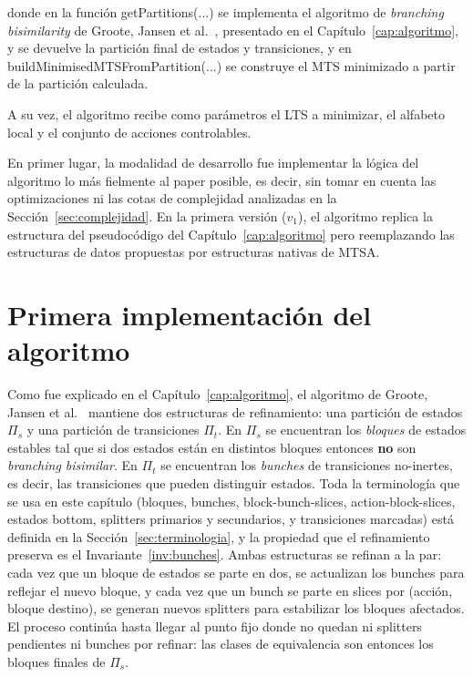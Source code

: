 donde en la función getPartitions(...) se implementa el algoritmo de \textit{branching bisimilarity} de Groote, Jansen et al.~\cite{groote2019}, presentado en el Capítulo~\ref{cap:algoritmo}, y se devuelve la partición final de estados y transiciones, y en buildMinimisedMTSFromPartition(...) se construye el MTS minimizado a partir de la partición calculada.

A su vez, el algoritmo recibe como parámetros el LTS a minimizar, el alfabeto local y el conjunto de acciones controlables. 

En primer lugar, la modalidad de desarrollo fue implementar la lógica del algoritmo lo más fielmente al paper posible, es decir, sin tomar en cuenta las optimizaciones ni las cotas de complejidad analizadas en la Sección~\ref{sec:complejidad}. En la primera versión ($v_1$), el algoritmo replica la estructura del pseudocódigo del Capítulo~\ref{cap:algoritmo} pero reemplazando las estructuras de datos propuestas por estructuras nativas de MTSA.

\section{Primera implementación del algoritmo}
\label{sec:v1}

Como fue explicado en el Capítulo~\ref{cap:algoritmo}, el algoritmo de Groote, Jansen et al.~\cite{groote2019} mantiene dos estructuras de refinamiento: una partición de estados $\Pi_s$ y una partición de transiciones $\Pi_t$. En $\Pi_s$ se encuentran los \textit{bloques} de estados estables tal que si dos estados están en distintos bloques entonces \textbf{no} son \textit{branching bisimilar}. En $\Pi_t$ se encuentran los \textit{bunches} de transiciones no-inertes, es decir, las transiciones que pueden distinguir estados. Toda la terminología que se usa en este capítulo (bloques, bunches, block-bunch-slices, action-block-slices, estados bottom, splitters primarios y secundarios, y transiciones marcadas) está definida en la Sección~\ref{sec:terminologia}, y la propiedad que el refinamiento preserva es el Invariante~\ref{inv:bunches}. Ambas estructuras se refinan a la par: cada vez que un bloque de estados se parte en dos, se actualizan los bunches para reflejar el nuevo bloque, y cada vez que un bunch se parte en slices por (acción, bloque destino), se generan nuevos splitters para estabilizar los bloques afectados. El proceso continúa hasta llegar al punto fijo donde no quedan ni splitters pendientes ni bunches por refinar: las clases de equivalencia son entonces los bloques finales de $\Pi_s$.

